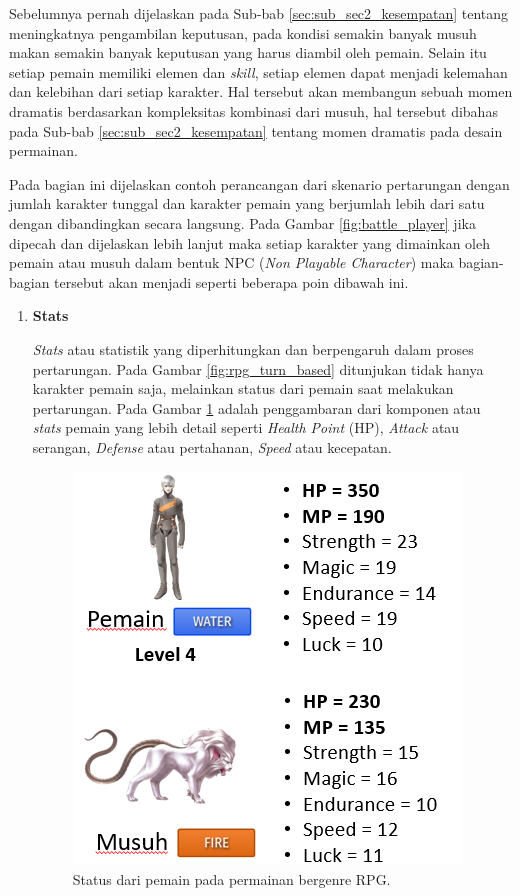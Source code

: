 \begin{subs}
	Sebelumnya pernah dijelaskan pada Sub-bab \ref{sec:sub_sec2_kesempatan} tentang meningkatnya pengambilan keputusan, pada kondisi semakin banyak musuh makan semakin banyak keputusan yang harus diambil oleh pemain. Selain itu setiap pemain memiliki elemen dan \textit{skill}, setiap elemen dapat menjadi kelemahan dan kelebihan dari setiap karakter. Hal tersebut akan membangun sebuah momen dramatis berdasarkan kompleksitas kombinasi dari musuh, hal tersebut dibahas pada Sub-bab \ref{sec:sub_sec2_kesempatan} tentang momen dramatis pada desain permainan.
	\vspace{1ex}
	
	Pada bagian ini dijelaskan contoh perancangan dari skenario pertarungan dengan jumlah karakter tunggal dan karakter pemain yang berjumlah lebih dari satu dengan dibandingkan secara langsung. Pada Gambar \ref{fig:battle_player} jika dipecah dan dijelaskan lebih lanjut maka setiap karakter yang dimainkan oleh pemain atau musuh dalam bentuk NPC (\textit{Non Playable Character}) maka bagian-bagian tersebut akan menjadi seperti beberapa poin dibawah ini.
	\vspace{1ex}
	
	\begin{enumerate}[label=\textbf{\arabic*).}]
		
		\item \textbf{Stats}
		\setlength{\parindent}{0.8cm}
		
		\textit{Stats} atau statistik yang diperhitungkan dan berpengaruh dalam proses pertarungan. Pada Gambar \ref{fig:rpg_turn_based} ditunjukan tidak hanya karakter pemain saja, melainkan status dari pemain saat melakukan pertarungan. Pada Gambar \ref{fig:player_stats} adalah penggambaran dari komponen atau \textit{stats} pemain yang lebih detail seperti \textit{Health Point} (HP), \textit{Attack} atau serangan, \textit{Defense} atau pertahanan, \textit{Speed} atau kecepatan.
		\vspace{1ex}
		
		\begin{figure} [!h] \centering
			\includegraphics[scale=0.6]{img/player_stats.png}
			\caption{Status dari pemain pada permainan bergenre RPG.}
			\label{fig:player_stats}
		\end{figure}
		

\end{enumerate}
\end{subs}
